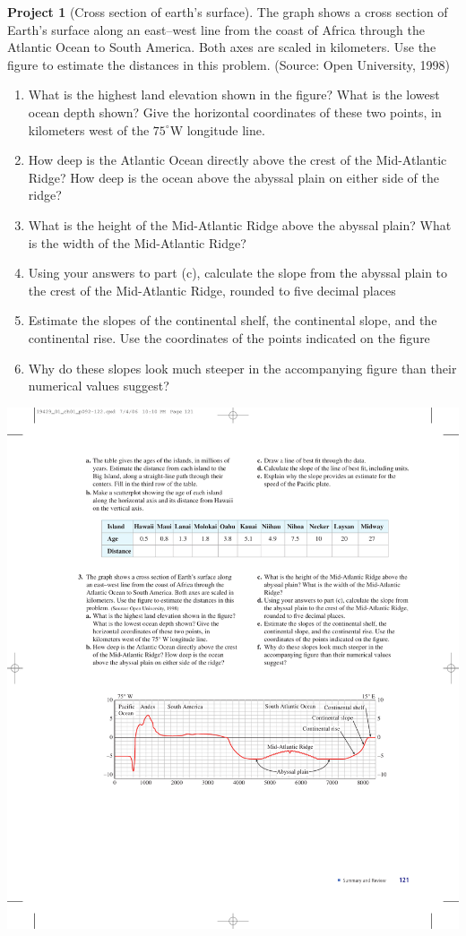 \documentclass[10pt,]{book}
\theoremstyle{plain}
\theoremstyle{definition}
\theoremstyle{definition}
\newtheorem{project}{Project}[chapter]
\theoremstyle{definition}
\theoremstyle{definition}
\numberwithin{equation}{part}
\newcommand\degree[0]{^{\circ}}
\begin{document}
\begin{project}[Cross section of earth's surface]\label{project-3}
The graph shows a cross section of Earth's surface along an east–west line from the coast of Africa through the Atlantic Ocean to South America. Both axes are scaled in kilometers. Use the figure to estimate the distances in this problem. (Source: Open University, 1998) \leavevmode%
\begin{enumerate}[label=*\alph**]
\item\hypertarget{li-1704}{}What is the highest land elevation shown in the figure? What is the lowest ocean depth shown? Give the horizontal coordinates of these two points, in kilometers west of the \(75\degree\)W longitude line.%
\item\hypertarget{li-1705}{}How deep is the Atlantic Ocean directly above the crest of the Mid-Atlantic Ridge? How deep is the ocean above the abyssal plain on either side of the ridge?%
\item\hypertarget{li-1706}{}What is the height of the Mid-Atlantic Ridge above the abyssal plain? What is the width of the Mid-Atlantic Ridge?%
\item\hypertarget{li-1707}{}Using your answers to part (c), calculate the slope from the abyssal plain to the crest of the Mid-Atlantic Ridge, rounded to five decimal places%
\item\hypertarget{li-1708}{}Estimate the slopes of the continental shelf, the continental slope, and the continental rise. Use the coordinates of the points indicated on the figure%
\item\hypertarget{li-1709}{}Why do these slopes look much steeper in the accompanying figure than their numerical values suggest?%
\end{enumerate}
%
\includegraphics[width=1\linewidth]{images/fig-chap1-proj-3}
\end{project}
\end{document}
